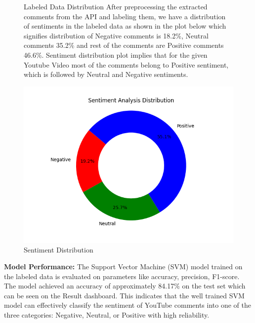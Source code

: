 \documentclass[11pt,article,oneside]{article}
\begin{document}
\begin{figure}[H]
\centering
\begin{minipage}{0.48\textwidth}
Labeled Data Distribution After preprocessing the extracted comments from the API and labeling them, we have a distribution of sentiments in the labeled data as shown in the plot below which signifies distribution of Negative comments is 18.2\%, Neutral comments 35.2\% and rest of the comments are Positive comments 46.6\%. Sentiment distribution plot implies that for the given Youtube Video most of the comments belong to Positive sentiment, which is followed by Neutral and Negative sentiments.
\end{minipage}\hfill
\begin{minipage}{0.48\textwidth}
\centering
\includegraphics[width=\textwidth]{images/sentiment_pie_chart.png}
\caption{Sentiment Distribution}
\end{minipage}

\end{figure}

\textbf{Model Performance:}
The Support Vector Machine (SVM) model trained on the labeled data is evaluated on parameters like accuracy, precision\citep{precisionRecall}, F1-score\citep{f1scoreSupport}. The model achieved an accuracy of approximately 84.17\% on the test set which can be seen on the Result dashboard. This indicates that the well trained SVM model can effectively classify the sentiment of YouTube comments into one of the three categories: Negative, Neutral, or Positive with high reliability. \\
\end{document}
